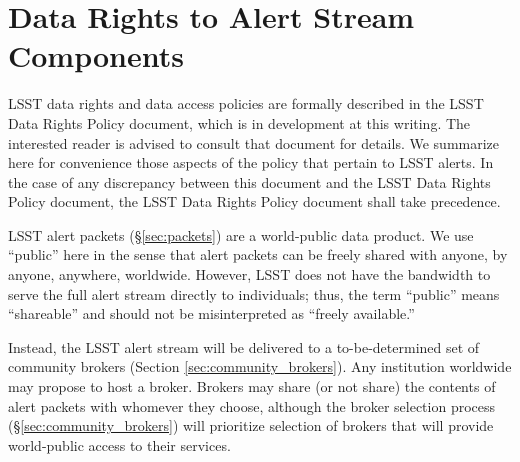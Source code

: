 \section{Data Rights to Alert Stream Components}\label{sec:data_rights}

LSST data rights and data access policies are formally described in the LSST Data Rights Policy document, which is in development at this writing.
The interested reader is advised to consult that document for details.
We summarize here for convenience those aspects of the policy that pertain to LSST alerts.
In the case of any discrepancy between this document and the LSST Data Rights Policy document, the LSST Data Rights Policy document shall take precedence.

LSST alert packets (\S \ref{sec:packets}) are a world-public data product.
We use ``public'' here in the sense that alert packets can be freely shared with anyone, by anyone, anywhere, worldwide.
However, LSST does not have the bandwidth to serve the full alert stream directly to individuals; thus, the term ``public'' means ``shareable'' and should not be misinterpreted as ``freely available.''

Instead, the LSST alert stream will be delivered to a to-be-determined set of community brokers (Section \ref{sec:community_brokers}).
Any institution worldwide may propose to host a broker.
Brokers may share (or not share) the contents of alert packets with whomever they choose, although the broker selection process (\S \ref{sec:community_brokers}) will prioritize selection of brokers that will provide world-public access to their services.
